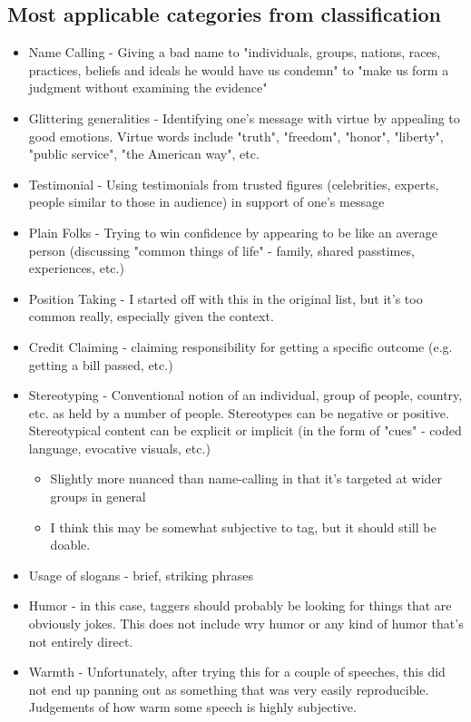 \documentclass[letterpaper]{article}
\begin{document}
\subsection{Most applicable categories from classification}
\begin{itemize}
	\item Name Calling - Giving a bad name to "individuals, groups, nations, races, practices, beliefs and ideals he would have us condemn" to "make us form a judgment without examining the evidence"
	\item Glittering generalities - Identifying one's message with virtue by appealing to good emotions. Virtue words include "truth", "freedom", "honor", "liberty", "public service", "the American way", etc. 
	\item Testimonial - Using testimonials from trusted figures (celebrities, experts, people similar to those in audience) in support of one's message
	\item Plain Folks - Trying to win confidence by appearing to be like an average person (discussing "common things of life" - family, shared passtimes, experiences, etc.)
	\item Position Taking - I started off with this in the original list, but it's too common really, especially given the context.
	\item Credit Claiming - claiming responsibility for getting a specific outcome (e.g. getting a bill passed, etc.)
	\item Stereotyping - Conventional notion of an individual, group of people, country, etc. as held by a number of people.  Stereotypes can be negative or positive. Stereotypical content can be explicit or implicit (in the form of "cues" - coded language, evocative visuals, etc.)
		\begin{itemize}
			\item Slightly more nuanced than name-calling in that it's targeted at wider groups in general
			\item I think this may be somewhat subjective to tag, but it should still be doable.
		\end{itemize}
	\item Usage of slogans - brief, striking phrases
	\item Humor - in this case, taggers should probably be looking for things that are obviously jokes. This does not include wry humor or any kind of humor that's not entirely direct.
	\item Warmth - Unfortunately, after trying this for a couple of speeches, this did not end up panning out as something that was very easily reproducible. Judgements of how warm some speech is highly subjective.

\end{itemize}
\end{document}
